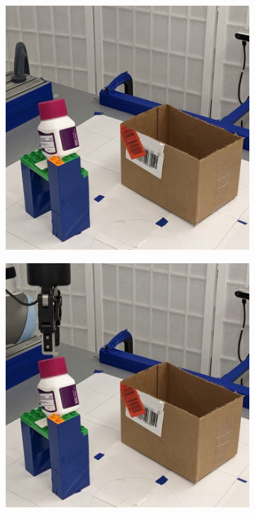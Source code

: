 \documentclass{article}
\begin{document}
\begin{figure}[]
    \centering

    \begin{subfigure}{(\linewidth - 0.05\linewidth)/5}
        \centering
        \includegraphics[width=\linewidth]{figures/episodes/bottle_in_box/10.jpg}
    \end{subfigure}
    \begin{subfigure}{(\linewidth - 0.05\linewidth)/5}
        \centering
        \includegraphics[width=\linewidth]{figures/episodes/bottle_in_box/9.jpg}

\end{subfigure}
\end{figure}
\end{document}
